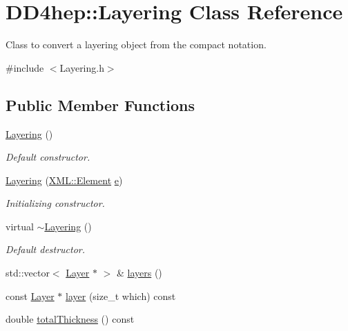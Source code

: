 \hypertarget{class_d_d4hep_1_1_layering}{}\section{D\+D4hep\+:\+:Layering Class Reference}
\label{class_d_d4hep_1_1_layering}


Class to convert a layering object from the compact notation.  




{\ttfamily \#include $<$Layering.\+h$>$}

\subsection*{Public Member Functions}
\begin{DoxyCompactItemize}
\item 
\hyperlink{class_d_d4hep_1_1_layering_aece09b62f4026ce23f6077fb677458ea}{Layering} ()
\begin{DoxyCompactList}\small\item\em Default constructor. \end{DoxyCompactList}\item 
\hyperlink{class_d_d4hep_1_1_layering_a0184f98f114c11134ac13ae521400dcc}{Layering} (\hyperlink{class_d_d4hep_1_1_x_m_l_1_1_element}{X\+M\+L\+::\+Element} \hyperlink{_volumes_8cpp_a8a9a1f93e9b09afccaec215310e64142}{e})
\begin{DoxyCompactList}\small\item\em Initializing constructor. \end{DoxyCompactList}\item 
virtual \hyperlink{class_d_d4hep_1_1_layering_a4b562fdcbadab7a0bb09121c53949335}{$\sim$\+Layering} ()
\begin{DoxyCompactList}\small\item\em Default destructor. \end{DoxyCompactList}\item 
std\+::vector$<$ \hyperlink{class_d_d4hep_1_1_layer}{Layer} $\ast$ $>$ \& \hyperlink{class_d_d4hep_1_1_layering_ab6b0103b1e2d3f16f3a423e9cf73c32b}{layers} ()
\item 
const \hyperlink{class_d_d4hep_1_1_layer}{Layer} $\ast$ \hyperlink{class_d_d4hep_1_1_layering_af892d89717de73b97655dcaac951541d}{layer} (size\+\_\+t which) const
\item 
double \hyperlink{class_d_d4hep_1_1_layering_a5f3e7587a288f09d80b23b5323e007a5}{total\+Thickness} () const
\item 

\end{DoxyCompactItemize}
